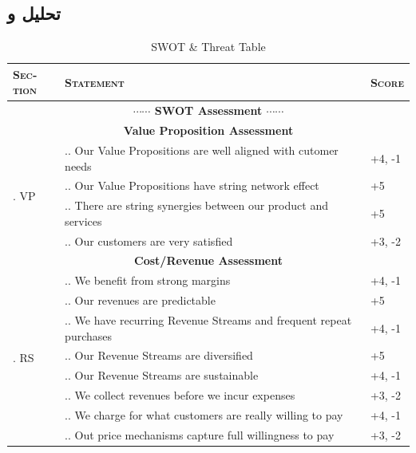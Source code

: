 \documentclass[dvipsnames, svgnames, x11names, 11pt]{article}
\newcounter{secq}
\newcommand{\seccnt}{\stepcounter{secq}\arabic{secq}. }
\newcounter{swotq}[secq]
\newcommand{\swotqcnt}{\stepcounter{swotq}\arabic{secq}.\arabic{swotq}. }
\begin{document}
\subsection{تحلیل  و }
\begin{latin}
\begin{center}
\begin{longtable}{p{}|p{}|p{}}
\caption{SWOT \& Threat Table}\\
\textsc{Section} & \textsc{Statement} & \textsc{Score} \\
\hline
\hline
\multicolumn{3}{c}{\textbf{{\large $\cdots\cdots$ SWOT Assessment $\cdots\cdots$}}} \\
\hline
\hline
\hline
\hline
\multicolumn{3}{c}{\textbf{Value Proposition Assessment}} \\
\hline
\hline
\multirow{4}{*}{\seccnt VP}
& \swotqcnt Our Value Propositions are well aligned with cutomer needs
& +4, -1 \\ \cline{2-3}
& \swotqcnt Our Value Propositions have string network effect
& +5 \\ \cline{2-3}
& \swotqcnt There are string synergies between our product and services
& +5 \\ \cline{2-3}
& \swotqcnt Our customers are very satisfied
& +3, -2 \\
\hline
\hline
\multicolumn{3}{c}{\textbf{Cost/Revenue Assessment}} \\
\hline
\hline
\multirow{8}{*}{\seccnt RS}
& \swotqcnt We benefit from strong margins
& +4, -1\\ \cline{2-3}
& \swotqcnt Our revenues are predictable
& +5\\ \cline{2-3}
& \swotqcnt We have recurring Revenue Streams and frequent repeat purchases
& +4, -1\\ \cline{2-3}
& \swotqcnt Our Revenue Streams are diversified
& +5\\ \cline{2-3}
& \swotqcnt Our Revenue Streams are sustainable
& +4, -1\\ \cline{2-3}
& \swotqcnt We collect revenues before we incur expenses
& +3, -2\\ \cline{2-3}
& \swotqcnt We charge for what customers are really willing to pay
& +4, -1\\ \cline{2-3}
& \swotqcnt Out price mechanisms capture full willingness to pay
& +3, -2\\ \hline


\end{longtable}
\end{center}
\end{latin}
\end{document}
